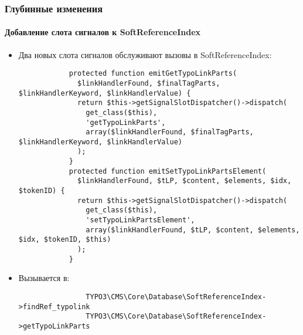 \begin{frame}[fragile]
	\frametitle{Глубинные изменения}
	\framesubtitle{Добавление слота сигналов к SoftReferenceIndex}

	\lstset{
		basicstyle=\tiny\ttfamily
	}

	\begin{itemize}
		\item
			\smaller
				Два новых слота сигналов обслуживают вызовы в SoftReferenceIndex:
			\normalsize

		\begin{lstlisting}
			protected function emitGetTypoLinkParts(
			  $linkHandlerFound, $finalTagParts, $linkHandlerKeyword, $linkHandlerValue) {
			  return $this->getSignalSlotDispatcher()->dispatch(
			    get_class($this),
			    'getTypoLinkParts',
			    array($linkHandlerFound, $finalTagParts, $linkHandlerKeyword, $linkHandlerValue)
			  );
			}
			protected function emitSetTypoLinkPartsElement(
			  $linkHandlerFound, $tLP, $content, $elements, $idx, $tokenID) {
			  return $this->getSignalSlotDispatcher()->dispatch(
			    get_class($this),
			    'setTypoLinkPartsElement',
			    array($linkHandlerFound, $tLP, $content, $elements, $idx, $tokenID, $this)
			  );
			}
		\end{lstlisting}

		\item
			\smaller
				Вызывается в:
			\normalsize

			\begin{lstlisting}
				TYPO3\CMS\Core\Database\SoftReferenceIndex->findRef_typolink
				TYPO3\CMS\Core\Database\SoftReferenceIndex->getTypoLinkParts
			\end{lstlisting}

	\end{itemize}

\end{frame}


